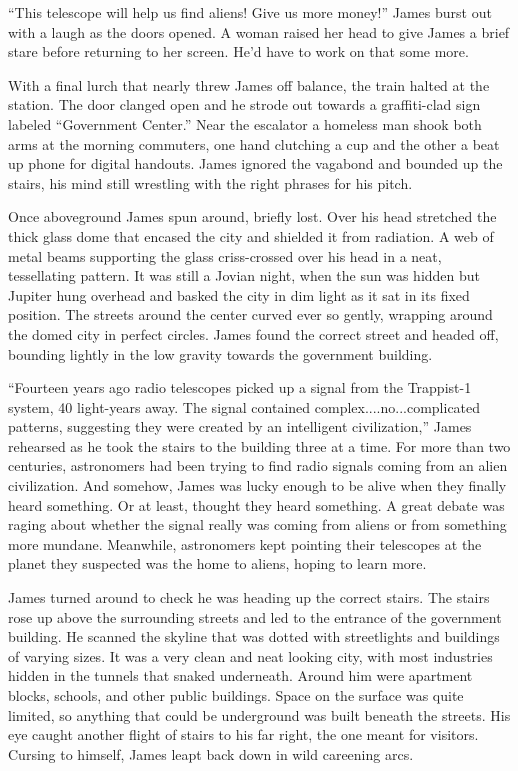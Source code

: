 \documentclass[12pt]{article} %
\begin{document}
``This telescope will help us find aliens! Give us more money!'' James burst out with a laugh as the doors opened. A woman raised her head to give James a brief stare before returning to her screen. He'd have to work on that some more.

With a final lurch that nearly threw James off balance, the train halted at the station. The door clanged open and he strode out towards a graffiti-clad sign labeled ``Government Center.'' Near the escalator a homeless man shook both arms at the morning commuters, one hand clutching a cup and the other a beat up phone for digital handouts. James ignored the vagabond and bounded up the stairs, his mind still wrestling with the right phrases for his pitch.

Once aboveground James spun around, briefly lost. Over his head stretched the thick glass dome that encased the city and shielded it from radiation. A web of metal beams supporting the glass criss-crossed over his head in a neat, tessellating pattern. It was still a Jovian night, when the sun was hidden but Jupiter hung overhead and basked the city in dim light as it sat in its fixed position. The streets around the center curved ever so gently, wrapping around the domed city in perfect circles. James found the correct street and headed off, bounding lightly in the low gravity towards the government building.

``Fourteen years ago radio telescopes picked up a signal from the Trappist-1 system, 40 light-years away. The signal contained complex....no...complicated patterns, suggesting they were created by an intelligent civilization,'' James rehearsed as he took the stairs to the building three at a time. For more than two centuries, astronomers had been trying to find radio signals coming from an alien civilization. And somehow, James was lucky enough to be alive when they finally heard something. Or at least, thought they heard something. A great debate was raging about whether the signal really was coming from aliens or from something more mundane. Meanwhile, astronomers kept pointing their telescopes at the planet they suspected was the home to aliens, hoping to learn more.

James turned around to check he was heading up the correct stairs. The stairs rose up above the surrounding streets and led to the entrance of the government building. He scanned the skyline that was dotted with streetlights and buildings of varying sizes. It was a very clean and neat looking city, with most industries hidden in the tunnels that snaked underneath. Around him were apartment blocks, schools, and other public buildings. Space on the surface was quite limited, so anything that could be underground was built beneath the streets. His eye caught another flight of stairs to his far right, the one meant for visitors. Cursing to himself, James leapt back down in wild careening arcs.
\end{document}
